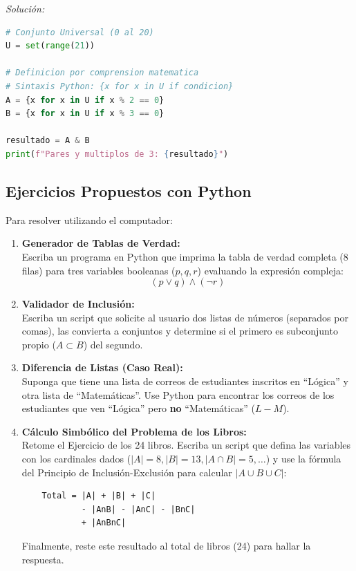 \textit{Solución:}
\begin{lstlisting}[language=Python, caption=Conjuntos por Comprensión (Set Comprehension)]
# Conjunto Universal (0 al 20)
U = set(range(21)) 

# Definicion por comprension matematica
# Sintaxis Python: {x for x in U if condicion}
A = {x for x in U if x % 2 == 0}
B = {x for x in U if x % 3 == 0}

resultado = A & B
print(f"Pares y multiplos de 3: {resultado}")
\end{lstlisting}

\subsection{Ejercicios Propuestos con Python}

Para resolver utilizando el computador:

\begin{enumerate}
    \item \textbf{Generador de Tablas de Verdad:} \\
    Escriba un programa en Python que imprima la tabla de verdad completa (8 filas) para tres variables booleanas ($p, q, r$) evaluando la expresión compleja: 
    \[ (p \lor q) \land (\lnot r) \]
    
    \item \textbf{Validador de Inclusión:} \\
    Escriba un script que solicite al usuario dos listas de números (separados por comas), las convierta a conjuntos y determine si el primero es subconjunto propio ($A \subset B$) del segundo.
    
    \item \textbf{Diferencia de Listas (Caso Real):} \\
    Suponga que tiene una lista de correos de estudiantes inscritos en ``Lógica'' y otra lista de ``Matemáticas''. Use Python para encontrar los correos de los estudiantes que ven ``Lógica'' pero \textbf{no} ``Matemáticas'' ($L - M$).
    
    \item \textbf{Cálculo Simbólico del Problema de los Libros:} \\
    Retome el Ejercicio de los 24 libros. Escriba un script que defina las variables con los cardinales dados ($|A|=8, |B|=13, |A \cap B|=5, \dots$) y use la fórmula del Principio de Inclusión-Exclusión para calcular $|A \cup B \cup C|$:
    \begin{verbatim}
    Total = |A| + |B| + |C| 
            - |AnB| - |AnC| - |BnC| 
            + |AnBnC|
    \end{verbatim}
    Finalmente, reste este resultado al total de libros (24) para hallar la respuesta.
\end{enumerate}